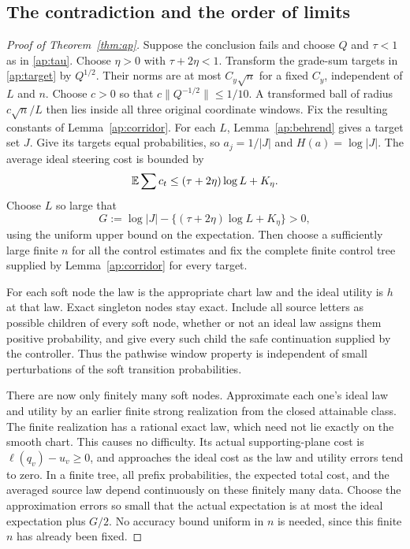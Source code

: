\subsection{The contradiction and the order of limits}

\begin{proof}[Proof of Theorem~\ref{thm:ap}]
Suppose the conclusion fails and choose \(Q\) and \(\tau<1\) as in
\eqref{ap:tau}.  Choose \(\eta>0\) with \(\tau+2\eta<1\).
Transform the grade-sum targets in \eqref{ap:target} by \(Q^{1/2}\).
Their norms are at most \(C_y\sqrt n\) for a fixed \(C_y\), independent
of \(L\) and \(n\).  Choose \(c>0\) so that
\(c\|Q^{-1/2}\|\leq1/10\).  A transformed ball of radius
\(c\sqrt n/L\) then lies inside all three original coordinate windows.
Fix the resulting constants of Lemma~\ref{ap:corridor}.
For each \(L\), Lemma~\ref{ap:behrend}
gives a target set \(J\).  Give its targets equal probabilities, so
\(a_j=1/|J|\) and \(H(a)=\log|J|\).  The average ideal steering
cost is bounded by
\[
 \mathbb E\sum c_t\leq(\tau+2\eta)\log L+K_\eta.
\]
Choose \(L\) so large that
\begin{equation}\label{ap:strict-gain}
 G:=\log|J|-\{(\tau+2\eta)\log L+K_\eta\}>0,
\end{equation}
using the uniform upper bound on the expectation.  Then choose a
sufficiently large finite \(n\) for all the control estimates and fix
the complete finite control tree supplied by Lemma~\ref{ap:corridor}
for every target.

For each soft node the law is the appropriate chart law and the ideal
utility is \(h\) at that law.  Exact singleton nodes stay exact.
Include all source letters as possible children of every soft node,
whether or not an ideal law assigns them positive probability, and give
every such child the safe continuation supplied by the controller.
Thus the pathwise window property is independent of small perturbations
of the soft transition probabilities.

There are now only finitely many soft nodes.  Approximate each one's
ideal law and utility by an earlier finite strong realization from the
closed attainable class.  The finite realization has a rational exact
law, which need not lie exactly on the smooth chart.  This causes no
difficulty.  Its actual supporting-plane cost is
\(\ell(q_v)-u_v\geq0\), and approaches the ideal cost as the law and
utility errors tend to zero.  In a finite tree, all prefix probabilities,
the expected total cost, and the averaged source law depend continuously
on these finitely many data.  Choose the approximation errors so small
that the actual expectation is at most the ideal expectation plus
\(G/2\).  No accuracy bound uniform in \(n\) is needed, since this
finite \(n\) has already been fixed.


\end{proof}
